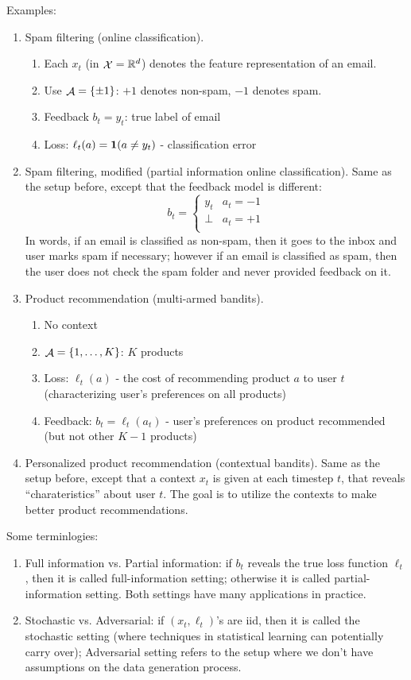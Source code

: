 \documentclass{article}
\DeclareMathOperator*{\Xcal}{{\cal X}}
\DeclareMathOperator*{\Acal}{{\cal A}}
\newcommand{\RR}{\mathbb{R}} %
\newcommand*{\one}{{\bf 1}}
\begin{document}
Examples:
\begin{enumerate}
\item Spam filtering (online classification).
\begin{enumerate}
  \item Each $x_t$ (in $\Xcal = \RR^d$) denotes the feature representation
of an email.
  \item Use $\Acal = \cbr{\pm 1}$: $+1$ denotes non-spam, $-1$ denotes spam.
  \item Feedback $b_t = y_t$: true label of email
  \item Loss: $\ell_t(a) = \one(a \neq y_t)$ - classification error
\end{enumerate}


\item Spam filtering, modified (partial information online classification).
Same as the setup before, except that the feedback model is different:
\[ b_t = \begin{cases} y_t & a_t = -1 \\ \bot & a_t = +1 \\ \end{cases} \]
In words, if an email is classified as non-spam, then it goes to the inbox and user marks
spam if necessary; however if an email is classified as spam, then the user does not
check the spam folder and never provided feedback on it.

\item Product recommendation (multi-armed bandits).
\begin{enumerate}
  \item No context
  \item $\Acal = \cbr{1,\ldots,K}$: $K$ products
  \item Loss: $\ell_t(a)$ - the cost of recommending product $a$ to user $t$ (characterizing user's preferences on all products)
  \item Feedback: $b_t = \ell_t(a_t)$ - user's preferences on product recommended (but not other $K-1$ products)
\end{enumerate}

\item Personalized product recommendation (contextual bandits).
Same as the setup before, except that a context $x_t$ is given at each timestep $t$, that reveals ``charateristics'' about user $t$. The goal is to utilize the contexts to make better product recommendations.
\end{enumerate}

Some terminlogies:
\begin{enumerate}
  \item Full information vs. Partial information: if $b_t$ reveals the true loss function $\ell_t$, then it is called full-information setting; otherwise it is called partial-information setting. Both settings have many applications in practice.
  \item Stochastic vs. Adversarial: if $(x_t, \ell_t)$'s are iid, then it is called the stochastic setting (where techniques in statistical learning can potentially carry over); Adversarial setting refers to the setup where we don't have assumptions on the data generation process.
\end{enumerate}
\end{document}
